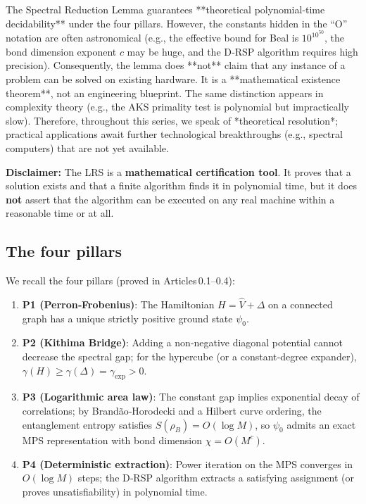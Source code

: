\documentclass[11pt,a4paper]{article}
\begin{document}
The Spectral Reduction Lemma guarantees **theoretical polynomial‑time decidability** under the four pillars. However, the constants hidden in the “O” notation are often astronomical (e.g., the effective bound for Beal is \(10^{10^{50}}\), the bond dimension exponent \(c\) may be huge, and the D‑RSP algorithm requires high precision). Consequently, the lemma does **not** claim that any instance of a problem can be solved on existing hardware. It is a **mathematical existence theorem**, not an engineering blueprint. The same distinction appears in complexity theory (e.g., the AKS primality test is polynomial but impractically slow). Therefore, throughout this series, we speak of *theoretical resolution*; practical applications await further technological breakthroughs (e.g., spectral computers) that are not yet available.

\begin{mdframed}[backgroundcolor=gray!10, linecolor=black]
\noindent\textbf{Disclaimer:} The LRS is a \textbf{mathematical certification tool}. It proves that a solution exists and that a finite algorithm finds it in polynomial time, but it does \textbf{not} assert that the algorithm can be executed on any real machine within a reasonable time or at all.
\end{mdframed}

\subsection{The four pillars}

We recall the four pillars (proved in Articles 0.1–0.4):

\begin{enumerate}
\item \textbf{P1 (Perron‑Frobenius)}: The Hamiltonian \(H = \hat{V} +\Delta\) on a connected graph has a unique strictly positive ground state \(\psi_0\).
\item \textbf{P2 (Kithima Bridge)}: Adding a non‑negative diagonal potential cannot decrease the spectral gap; for the hypercube (or a constant‑degree expander), \(\gamma(H)\geq \gamma(\Delta) = \gamma_{\mathrm{exp}} > 0\).
\item \textbf{P3 (Logarithmic area law)}: The constant gap implies exponential decay of correlations; by Brandão‑Horodecki and a Hilbert curve ordering, the entanglement entropy satisfies \(S(\rho_{B}) = O(\log M)\), so \(\psi_0\) admits an exact MPS representation with bond dimension \(\chi = O(M^{c})\).
\item \textbf{P4 (Deterministic extraction)}: Power iteration on the MPS converges in \(O(\log M)\) steps; the D‑RSP algorithm extracts a satisfying assignment (or proves unsatisfiability) in polynomial time.
\end{enumerate}
\end{document}
